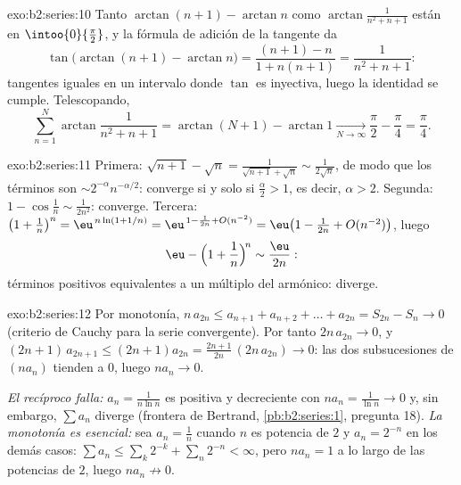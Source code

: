 \begin{solution}{exo:b2:series:10}
Tanto $\arctan(n+1) - \arctan n$ como $\arctan\frac{1}{n^2+n+1}$
están en $\intoo{0}{\frac\pi2}$, y la fórmula de adición de la
tangente da
\[
\tan\bigl(\arctan(n{+}1) - \arctan n\bigr)
= \frac{(n+1) - n}{1 + n(n+1)} = \frac{1}{n^2 + n + 1} :
\]
tangentes iguales en un intervalo donde $\tan$ es inyectiva, luego
la identidad se cumple. Telescopando,
\[
\sum_{n=1}^{N}\arctan\frac{1}{n^2+n+1}
= \arctan(N{+}1) - \arctan 1 \xrightarrow[N\to\infty]{}
\frac\pi2 - \frac\pi4 = \frac\pi4 .
\]

\end{solution}

\begin{solution}{exo:b2:series:11}
Primera: $\sqrt{n+1} - \sqrt n = \frac{1}{\sqrt{n+1} + \sqrt n} \sim
\frac{1}{2\sqrt n}$, de modo que los términos son $\sim
2^{-\alpha}n^{-\alpha/2}$: converge si y solo si $\frac\alpha2 > 1$,
es decir, $\alpha > 2$. Segunda: $1 - \cos\frac1n \sim
\frac{1}{2n^2}$: converge. Tercera: $\bigl(1 + \frac1n\bigr)^n =
\eu^{\,n\ln(1 + 1/n)} = \eu^{\,1 - \frac1{2n} + O(n^{-2})} =
\eu\bigl(1 - \frac{1}{2n} + O(n^{-2})\bigr)$, luego
\[
\eu - \Bigl(1 + \frac1n\Bigr)^{\!n} \sim \frac{\eu}{2n} :
\]
términos positivos equivalentes a un múltiplo del armónico:
diverge.
\end{solution}

\begin{solution}{exo:b2:series:12}
Por monotonía, $n\,a_{2n} \leq a_{n+1} + a_{n+2} + \dots + a_{2n} =
S_{2n} - S_n \to 0$ (criterio de Cauchy para la serie convergente).
Por tanto $2n\,a_{2n} \to 0$, y $(2n{+}1)\,a_{2n+1} \leq
(2n{+}1)a_{2n} = \frac{2n+1}{2n}\,(2n\,a_{2n}) \to 0$: las dos
subsucesiones de $(na_n)$ tienden a $0$, luego $na_n \to 0$.

\emph{El recíproco falla:} $a_n = \frac1{n\ln n}$ es positiva y
decreciente con $na_n = \frac1{\ln n} \to 0$ y, sin embargo, $\sum
a_n$ diverge (frontera de Bertrand, \cref{pb:b2:series:1}, pregunta
18). \emph{La monotonía es esencial:} sea $a_n = \frac1n$ cuando $n$
es potencia de $2$ y $a_n = 2^{-n}$ en los demás casos: $\sum a_n
\leq \sum_k 2^{-k} + \sum_n 2^{-n} < \infty$, pero $na_n = 1$ a lo
largo de las potencias de $2$, luego $na_n \not\to 0$.
\end{solution}

